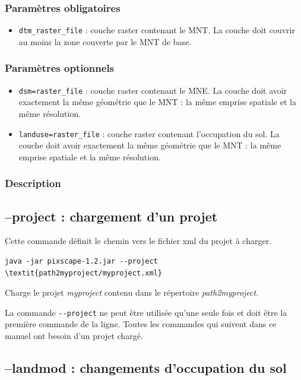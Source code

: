 \documentclass{report}
\begin{document}
\subsubsection{Paramètres obligatoires}
\begin{itemize}
	\item \verb|dtm_raster_file| : couche raster contenant le MNT. La couche doit couvrir au moins la zone couverte par le MNT de base.
\end{itemize}

\subsubsection{Paramètres optionnels}
\begin{itemize}
	\item \verb|dsm=raster_file| : couche raster contenant le MNE. La couche doit avoir exactement la même géométrie que le MNT : la même emprise spatiale et la même résolution.
	\item \verb|landuse=raster_file| : couche raster contenant l'occupation du sol. La couche doit avoir exactement la même géométrie que le MNT : la même emprise spatiale et la même résolution.
\end{itemize}

\subsubsection{Description}



\subsection{--project : chargement d'un projet}
Cette commande définit le chemin vers le fichier xml du projet à charger.
\begin{Verbatim}[commandchars=\\\{\}]
java -jar pixscape-1.2.jar --project \textit{path2myproject/myproject.xml}
\end{Verbatim}
Charge le projet \textit{myproject} contenu dans le répertoire \textit{path2myproject}.

La commande \verb|--project| ne peut être utilisée qu'une seule fois et doit être la première commande de la ligne.
Toutes les commandes qui suivent dans ce manuel ont besoin d'un projet chargé.

\subsection{--landmod : changements d'occupation du sol}
\end{document}
